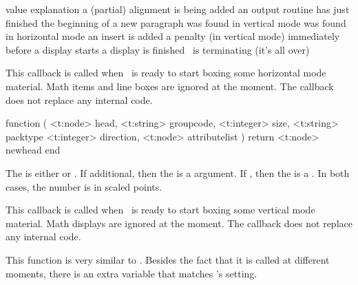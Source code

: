 \starttabulate[|l|p|]
\FL
\BC value                 \BC explanation                                 \NC \NR
\ML
\NC {}      \NC a (partial) alignment is being added        \NC \NR
\NC {}   \NC an output routine has just finished         \NC \NR
\NC {}       \NC the beginning of a new paragraph            \NC \NR
\NC {}      \NC \type {\par} was found in vertical mode     \NC \NR
\NC {}      \NC \type {\par} was found in horizontal mode   \NC \NR
\NC {}         \NC an insert is added                          \NC \NR
\NC {}        \NC a penalty (in vertical mode)                \NC \NR
\NC {} \NC immediately before a display starts         \NC \NR
\NC {}  \NC a display is finished                       \NC \NR
\NC {}            \NC \LUAMETATEX\ is terminating (it's all over) \NC \NR
\LL
\stoptabulate


\stopsubsection

\startsubsection[title=hpack_filter]

This callback is called when \TEX\ is ready to start boxing some horizontal mode
material. Math items and line boxes are ignored at the moment. The callback does
not replace any internal code.

\starttyping[option=LUA]
function (
    <t:node>    head,
    <t:string>  groupcode,
    <t:integer> size,
    <t:string>  packtype
    <t:integer> direction,
    <t:node>    attributelist
)
    return <t:node> newhead
end
\stoptyping

The  is either  or . If \type
{additional}, then the  is a  argument. If
, then the  is a . In both cases,
the number is in scaled points.

\stopsubsection

\startsubsection[title=vpack_filter]

This callback is called when \TEX\ is ready to start boxing some vertical mode
material. Math displays are ignored at the moment. The callback does not replace
any internal code.

This function is very similar to . Besides the fact
that it is called at different moments, there is an extra variable that matches
\TEX's \type {\maxdepth} setting.

